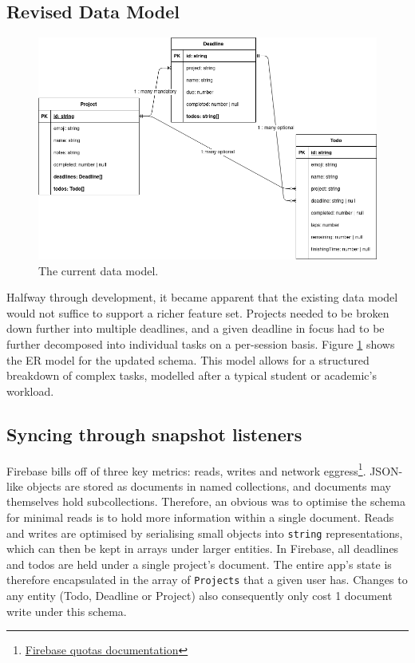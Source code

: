 \subsection{Revised Data Model}
\begin{figure}[h]
    \begin{center}
        \includegraphics[scale=0.5]{images/final_data_model.png}
    \end{center}
    \caption{The current data model.}
    \label{fig:app_current_data_model}
\end{figure}

Halfway through development, it became apparent that the existing data model would not suffice to support a richer feature set. Projects needed to be broken down further into multiple deadlines, and a given deadline in focus had to be further decomposed into individual tasks on a per-session basis. Figure \ref{fig:app_current_data_model} shows the ER model for the updated schema. This model allows for a structured breakdown of complex tasks, modelled after a typical student or academic's workload.

\subsection{Syncing through snapshot listeners}
Firebase bills off of three key metrics: reads, writes and network eggress\footnote{\href{https://cloud.google.com/firestore/quotas}{Firebase quotas documentation}}. JSON-like objects are stored as documents in named collections, and documents may themselves hold subcollections. Therefore, an obvious was to optimise the schema for minimal reads is to hold more information within a single document. Reads and writes are optimised by serialising small objects into \texttt{string} representations, which can then be kept in arrays under larger entities. In Firebase, all deadlines and todos are held under a single project's document. The entire app's state is therefore encapsulated in the array of \texttt{Projects} that a given user has. Changes to any entity (Todo, Deadline or Project) also consequently only cost 1 document write under this schema.

